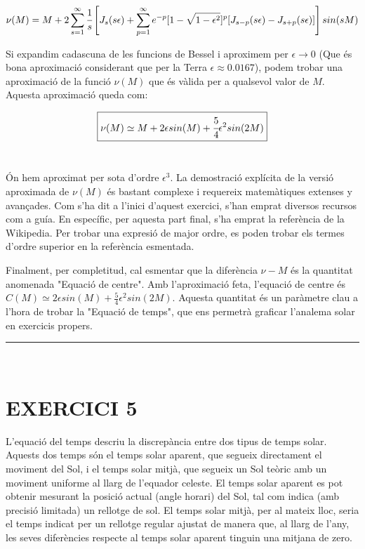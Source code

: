 \documentclass[a4paper, 11pt]{article}
\begin{document}
\begin{equation*}
    \nu(M) = M + 2\sum_{s=1}^{\infty} \cfrac{1}{s} \left[ J_s(s\epsilon) + \sum_{p=1}^{\infty} e^{-p}[1-\sqrt{1-\epsilon^2}]^p[J_{s-p}(s\epsilon) - J_{s+p}(s\epsilon)] \right] sin(sM)
\end{equation*}
\vspace{2mm}

\noindent Si expandim cadascuna de les funcions de Bessel i aproximem per $\epsilon \to 0$ (Que és bona aproximació considerant que per la Terra $\epsilon \approx 0.0167$), podem trobar una aproximació de la funció $\nu(M)$ que és vàlida per a qualsevol valor de $M$. Aquesta aproximació queda com:

\vspace{2mm}
\begin{equation} \label{aproximacio_Mnu}
    \boxed{  \nu(M) \simeq M + 2\epsilon sin(M) + \cfrac{5}{4} \epsilon ^2 sin(2M)  }
\end{equation}\
\vspace{2mm}

\noindent Ón hem aproximat per sota d'ordre $\epsilon^3$. La demostració explícita de la versió aproximada de $\nu(M)$ és bastant complexe i requereix matemàtiques extenses y avançades. Com s'ha dit a l'inici d'aquest exercici, s'han emprat diversos recursos com a guía. En específic, per aquesta part final, s'ha emprat la referència \cite{EQ_OF_CENTER} de la Wikipedia. Per trobar una expresió de major ordre, es poden trobar els termes d'ordre superior en la referència esmentada.

\vspace{2mm}

\noindent Finalment, per completitud, cal esmentar que la diferència $\nu - M$ és la quantitat anomenada "Equació de centre". Amb l'aproximació feta, l'equació de centre és  $C(M) \simeq 2\epsilon sin(M) + \frac{5}{4} \epsilon ^2 sin(2M)$. Aquesta quantitat és un paràmetre clau a l'hora de trobar la "Equació de temps", que ens permetrà graficar l'analema solar en exercicis propers.

\vspace{10mm}
\hrule\
\vspace{5mm}


\section*{EXERCICI 5}
\noindent L’equació del temps descriu la discrepància entre dos tipus de temps solar. Aquests dos temps són el temps solar aparent, que segueix directament el moviment del Sol, i el temps solar mitjà, que segueix un Sol teòric amb un moviment uniforme al llarg de l’equador celeste. El temps solar aparent es pot obtenir mesurant la posició actual (angle horari) del Sol, tal com indica (amb precisió limitada) un rellotge de sol. El temps solar mitjà, per al mateix lloc, seria el temps indicat per un rellotge regular ajustat de manera que, al llarg de l’any, les seves diferències respecte al temps solar aparent tinguin una mitjana de zero.
\end{document}
